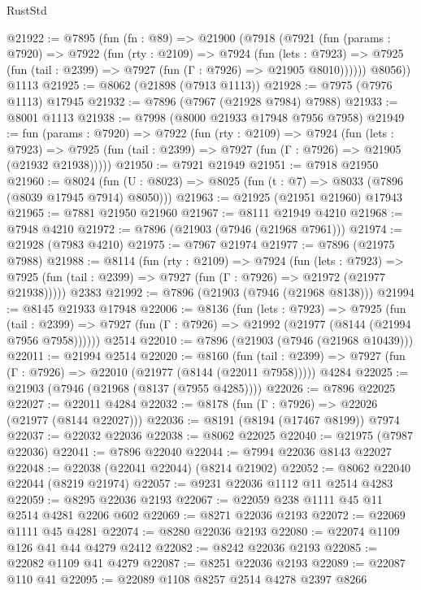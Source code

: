 \begin{lexlean}{RustStd}
\begin{coremodule}
@21922 := @7895
    (fun (fn : @89) =>
    @21900
      (@7918
        (@7921
          (fun (params : @7920) =>
          @7922
            (fun (rty : @2109) =>
            @7924
              (fun (lets : @7923) =>
              @7925 (fun (tail : @2399) => @7927 (fun (Γ : @7926) => @21905 @8010))))))
        @8056))
    @1113
@21925 := @8062 (@21898 (@7913 @1113))
@21928 := @7975 (@7976 @1113) @17945
@21932 := @7896 (@7967 (@21928 @7984) @7988)
@21933 := @8001 @1113
@21938 := @7998 (@8000 @21933 @17948 @7956 @7958)
@21949 := fun (params : @7920) =>
  @7922
    (fun (rty : @2109) =>
    @7924
      (fun (lets : @7923) =>
      @7925 (fun (tail : @2399) => @7927 (fun (Γ : @7926) => @21905 (@21932 @21938)))))
@21950 := @7921 @21949
@21951 := @7918 @21950
@21960 := @8024
    (fun (U : @8023) => @8025 (fun (t : @7) => @8033 (@7896 (@8039 @17945 @7914) @8050)))
@21963 := @21925 (@21951 @21960) @17943
@21965 := @7881 @21950 @21960
@21967 := @8111 @21949 @4210
@21968 := @7948 @4210
@21972 := @7896 (@21903 (@7946 (@21968 @7961)))
@21974 := @21928 (@7983 @4210)
@21975 := @7967 @21974
@21977 := @7896 (@21975 @7988)
@21988 := @8114
    (fun (rty : @2109) =>
    @7924
      (fun (lets : @7923) =>
      @7925 (fun (tail : @2399) => @7927 (fun (Γ : @7926) => @21972 (@21977 @21938)))))
    @2383
@21992 := @7896 (@21903 (@7946 (@21968 @8138)))
@21994 := @8145 @21933 @17948
@22006 := @8136
    (fun (lets : @7923) =>
    @7925
      (fun (tail : @2399) =>
      @7927 (fun (Γ : @7926) => @21992 (@21977 (@8144 (@21994 @7956 @7958))))))
    @2514
@22010 := @7896 (@21903 (@7946 (@21968 @10439)))
@22011 := @21994 @2514
@22020 := @8160
    (fun (tail : @2399) => @7927 (fun (Γ : @7926) => @22010 (@21977 (@8144 (@22011 @7958)))))
    @4284
@22025 := @21903 (@7946 (@21968 (@8137 (@7955 @4285))))
@22026 := @7896 @22025
@22027 := @22011 @4284
@22032 := @8178 (fun (Γ : @7926) => @22026 (@21977 (@8144 @22027)))
@22036 := @8191 (@8194 (@17467 @8199)) @7974
@22037 := @22032 @22036
@22038 := @8062 @22025
@22040 := @21975 (@7987 @22036)
@22041 := @7896 @22040
@22044 := @7994 @22036 @8143 @22027
@22048 := @22038 (@22041 @22044) (@8214 @21902)
@22052 := @8062 @22040 @22044 (@8219 @21974)
@22057 := @9231 @22036 @1112 @11 @2514 @4283
@22059 := @8295 @22036 @2193
@22067 := @22059 @238 @1111 @45 @11 @2514 @4281 @2206 @602
@22069 := @8271 @22036 @2193
@22072 := @22069 @1111 @45 @4281
@22074 := @8280 @22036 @2193
@22080 := @22074 @1109 @126 @41 @44 @4279 @2412
@22082 := @8242 @22036 @2193
@22085 := @22082 @1109 @41 @4279
@22087 := @8251 @22036 @2193
@22089 := @22087 @110 @41
@22095 := @22089 @1108 @8257 @2514 @4278 @2397 @8266

\end{coremodule}
\end{lexlean}

